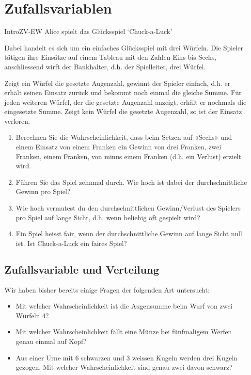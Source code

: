\section{Zufallsvariablen}


\begin{LA}
    {}{IntroZV-EW}
    Alice spielt das Glücksspiel `Chuck-a-Luck'

    Dabei handelt es sich um ein einfaches Glücksspiel mit drei Würfeln. Die Spieler tätigen ihre Einsätze auf einem Tableau mit den Zahlen Eins bis Sechs, anschliessend wirft der Bankhalter, d.h. der Spielleiter, drei Würfel.

    Zeigt ein Würfel die gesetzte Augenzahl, gewinnt der Spieler einfach, d.h. er erhält seinen Einsatz zurück und bekommt noch einmal die gleiche Summe. Für jeden weiteren Würfel, der die gesetzte Augenzahl anzeigt, erhält er nochmals die eingesetzte Summe. Zeigt kein Würfel die gesetzte Augenzahl, so ist der Einsatz verloren.

    \begin{enumerate}
        \item Berechnen Sie die Wahrscheinlichkeit, dass beim Setzen auf «Sechs» und einem Einsatz von einem Franken ein Gewinn von drei Franken, zwei Franken, einem Franken, von minus einem Franken (d.h. ein Verlust) erzielt wird.

        \item Führen Sie das Spiel zehnmal durch. Wie hoch ist dabei der durchschnittliche Gewinn pro Spiel?

        \item Wie hoch vermutest du den durchschnittlichen Gewinn/Verlust des Spielers pro Spiel auf lange Sicht, d.h. wenn beliebig oft gespielt wird?

        \item Ein Spiel heisst fair, wenn der durchschnittliche Gewinn auf lange Sicht null ist. Ist Chuck-a-Luck ein faires Spiel?
    \end{enumerate}

\end{LA}

\clearpage
\subsection{Zufallsvariable und Verteilung}
Wir haben bisher bereits einige Fragen der folgenden Art untersucht:

\begin{itemize}
    \item Mit welcher Wahrscheinlichkeit ist die Augensumme beim Wurf von zwei Würfeln 4?
    \item Mit welcher Wahrscheinlichkeit fällt eine Münze bei fünfmaligem Werfen genau einmal auf Kopf?
    \item Aus einer Urne mit 6 schwarzen und 3 weissen Kugeln werden drei Kugeln gezogen. Mit welcher Wahrscheinlichkeit sind genau zwei davon schwarz?
\end{itemize}

